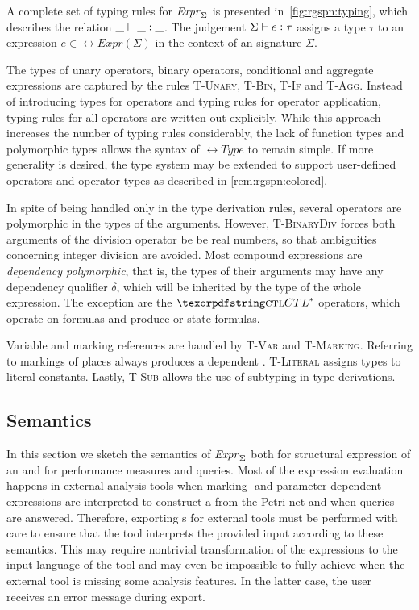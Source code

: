 A complete set of typing rules for \(\textrm{\itshape Expr\/}_\Sigma\) is presented in~\vref{fig:rgspn:typing}, which describes the relation \(\_ \vdash \_ \mathrel{\vcentcolon} \_\). The judgement \(\Sigma \vdash e \mathrel{\vcentcolon} \tau\) assigns a type \(\tau\) to an expression \(e \in \rel{Expr}(\Sigma)\) in the context of an  signature \(\Sigma\). 

The types of unary operators, binary operators, conditional and aggregate expressions are captured by the rules \textsc{T-Unary}, \textsc{T-Bin}, \textsc{T-If} and \textsc{T-Agg}. Instead of introducing types for operators and typing rules for operator application, typing rules for all operators are written out explicitly. While this approach increases the number of typing rules considerably, the lack of function types and polymorphic types allows the syntax of \(\rel{Type}\) to remain simple. If more generality is desired, the type system may be extended to support user-defined operators and operator types as described in \vref{rem:rgspn:colored}.

In spite of being handled only in the type derivation rules, several operators are polymorphic in the types of the arguments. However, \textsc{T-BinaryDiv} forces both arguments of the division operator be be real numbers, so that ambiguities concerning integer division are avoided. Most compound expressions are \emph{dependency polymorphic}, that is, the types of their arguments may have any dependency qualifier \(\delta\), which will be inherited by the type of the whole expression. The exception are the \(\textabbr{CTL}^*\) operators, which operate on  formulas and produce  or  state formulas. 

Variable and marking references are handled by \textsc{T-Var} and \textsc{T-Marking}. Referring to markings of places always produces a  dependent . \textsc{T-Literal} assigns  types to literal constants. Lastly, \textsc{T-Sub} allows the use of subtyping in type derivations.

\subsection{Semantics}
\label{ssec:rgspn:semantics}

In this section we sketch the semantics of \(\textrm{\itshape Expr\/}_\Sigma\) both for structural expression of an  and for performance measures and queries. Most of the expression evaluation happens in external analysis tools when marking- and parameter-dependent expressions are interpreted to construct a  from the Petri net and when queries are answered. Therefore, exporting s for external tools must be performed with care to ensure that the tool interprets the provided input according to these semantics. This may require nontrivial transformation of the expressions to the input language of the tool and may even be impossible to fully achieve when the external tool is missing some analysis features. In the latter case, the user receives an error message during export.

